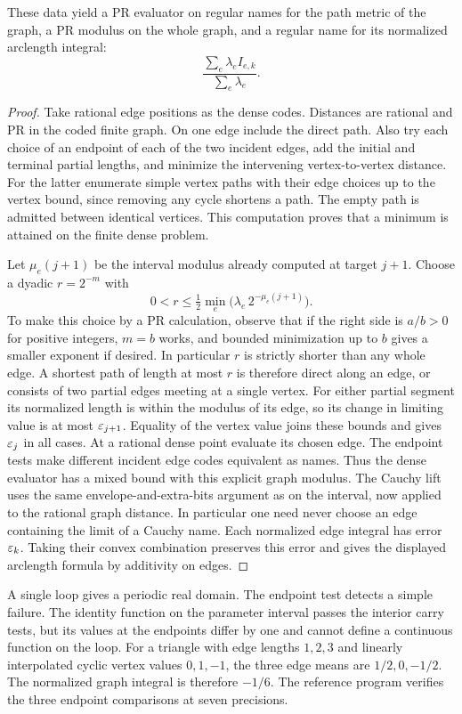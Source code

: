 \begin{corollary}
These data yield a PR evaluator on regular names for the path metric of the graph, a PR modulus on the whole graph, and a regular name for its normalized arclength integral:
\[
             \frac{\sum_e\lambda_e I_{e,k}}{\sum_e\lambda_e}.
\]
\end{corollary}
\begin{proof}
Take rational edge positions as the dense codes. Distances are rational and PR in the coded finite graph. On one edge include the direct path. Also try each choice of an endpoint of each of the two incident edges, add the initial and terminal partial lengths, and minimize the intervening vertex-to-vertex distance. For the latter enumerate simple vertex paths with their edge choices up to the vertex bound, since removing any cycle shortens a path. The empty path is admitted between identical vertices. This computation proves that a minimum is attained on the finite dense problem.

Let $\mu_e(j+1)$ be the interval modulus already computed at target $j+1$. Choose a dyadic $r=2^{-m}$ with
\[
  0<r\le \tfrac12\min_e\bigl(\lambda_e\,2^{-\mu_e(j+1)}\bigr).
\]
To make this choice by a PR calculation, observe that if the right side is $a/b>0$ for positive integers, $m=b$ works, and bounded minimization up to $b$ gives a smaller exponent if desired. In particular $r$ is strictly shorter than any whole edge. A shortest path of length at most $r$ is therefore direct along an edge, or consists of two partial edges meeting at a single vertex. For either partial segment its normalized length is within the modulus of its edge, so its change in limiting value is at most $\varepsilon_{j+1}$. Equality of the vertex value joins these bounds and gives $\varepsilon_j$ in all cases. At a rational dense point evaluate its chosen edge. The endpoint tests make different incident edge codes equivalent as names. Thus the dense evaluator has a mixed bound with this explicit graph modulus. The Cauchy lift uses the same envelope-and-extra-bits argument as on the interval, now applied to the rational graph distance. In particular one need never choose an edge containing the limit of a Cauchy name. Each normalized edge integral has error $\varepsilon_k$. Taking their convex combination preserves this error and gives the displayed arclength formula by additivity on edges.
\end{proof}
A single loop gives a periodic real domain. The endpoint test detects a simple failure. The identity function on the parameter interval passes the interior carry tests, but its values at the endpoints differ by one and cannot define a continuous function on the loop. For a triangle with edge lengths $1,2,3$ and linearly interpolated cyclic vertex values $0,1,-1$, the three edge means are $1/2,0,-1/2$. The normalized graph integral is therefore $-1/6$. The reference program verifies the three endpoint comparisons at seven precisions.


